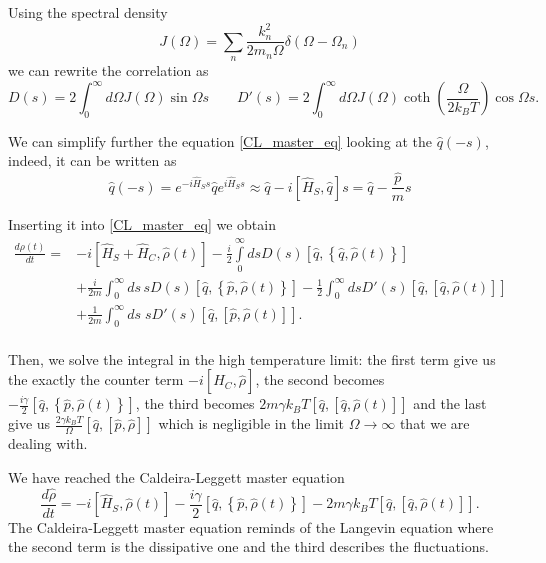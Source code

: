 Using the spectral density
\begin{equation}
    J(\Omega) = \sum_n \frac{k_n^2}{2m_n\Omega}\delta(\Omega-\Omega_n)
\end{equation}
we can rewrite the correlation as
\begin{equation}
    D(s) = 2\int_0^\infty d\Omega J(\Omega) \sin\Omega s \qquad D'(s) = 2\int_0^\infty d\Omega J(\Omega) \coth\left(\frac{\Omega}{2k_BT}\right)\cos\Omega s.
\end{equation}

We can simplify further the equation \eqref{CL_master_eq} looking at the $\hat q(-s)$, indeed, it can be written as 
\begin{equation}
    \hat q(-s) = e^{-i\hat H_S s} \hat q e^{i\hat H_S s} \approx \hat q- i\left[\hat H_S, \hat q\right]s = \hat q - \frac{\hat p}{m}s 
\end{equation}

Inserting it into \eqref{CL_master_eq} we obtain
\begin{equation}
    \begin{split}
        \frac{d \rho(t)}{dt} = & -i\left[\hat H_S+ \hat H_C, \hat\rho(t)\right] -\frac{i}{2}\int\limits_0^\infty ds  D(s)\left[\hat q, \left\{\hat q, \hat \rho(t)\right\}\right]\\
        &+ \frac{i}{2m}\int_0^\infty ds \, sD(s)\left[\hat q, \left\{\hat p, \hat \rho(t)\right\}\right] - \frac{1}{2}\int_0^\infty ds D'(s)\left[\hat q, \left[\hat q, \hat\rho(t)\right]\right]\\
        & +\frac{1}{2m}\int_0^\infty ds \; sD'(s)\left[\hat q, \left[\hat p, \hat\rho(t)\right]\right].\\
    \end{split}  
\end{equation}

Then, we solve the integral in the high temperature limit: the first term give us the exactly the counter term  $-i\left[\hat H_C, \hat \rho\right]$, the second becomes $-\frac{i\gamma}{2}\left[\hat q, \left\{\hat p,\hat \rho(t)\right\}\right]$, the third becomes $2m \gamma k_BT\left[\hat q,\left[\hat q,\hat\rho(t)\right]\right]$ and the last give us $\frac{2\gamma k_BT}{\Omega}\left[\hat q, \left[\hat p, \hat \rho\right]\right]$ which is negligible in the limit $\Omega \rightarrow \infty$ that we are dealing with.

We have reached the Caldeira-Leggett master equation
\begin{equation} \label{Caldeira-Leggett_master_equation}
    \frac{d\hat\rho}{dt} = -i\left[\hat H_S, \hat\rho(t)\right]-\frac{i\gamma}{2}\left[\hat q, \left\{\hat p,\hat \rho(t)\right\}\right] - 2m \gamma k_BT\left[\hat q,\left[\hat q,\hat\rho(t)\right]\right]. 
\end{equation}
The Caldeira-Leggett master equation reminds of the Langevin equation where the second term is the dissipative one and the third describes the fluctuations.
